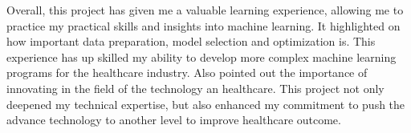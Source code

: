 Overall, this project has given me a valuable learning experience, allowing me to practice my practical skills and insights into machine learning. It highlighted on how important data preparation, model selection and optimization is. This experience has up skilled my ability to develop more complex machine learning programs for the healthcare industry. Also pointed out the importance of innovating in the field of the technology an healthcare. This project not only deepened my technical expertise, but also enhanced my commitment to push the advance technology to another level to improve healthcare outcome.
